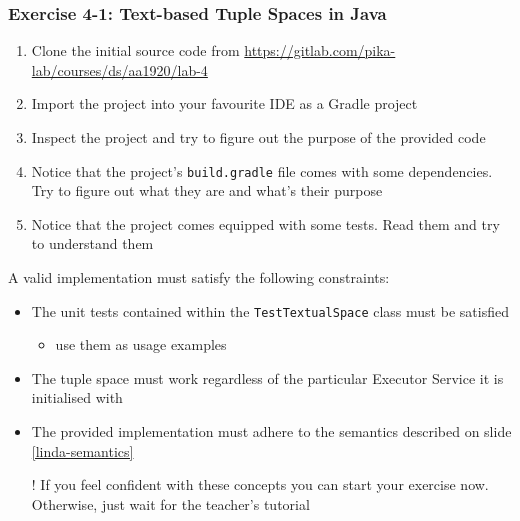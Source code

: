 \documentclass[presentation]{beamer}\mode<presentation>{\usetheme{AMSCesenaPurpleAndGold}}
\begin{document}
\begin{frame}[allowframebreaks]
\frametitle{Exercise 4-1: Text-based Tuple Spaces in Java}

\begin{enumerate}
	\item Clone the initial source code from \url{https://gitlab.com/pika-lab/courses/ds/aa1920/lab-4}
	
	\item Import the project into your favourite IDE as a Gradle project
	
	\item Inspect the project and try to figure out the purpose of the provided code
	
	\item Notice that the project's \texttt{build.gradle} file comes with some dependencies.
	Try to figure out what they are and what's their purpose
	
	\item Notice that the project comes equipped with some tests. 
	Read them and try to understand them
\end{enumerate}



\framebreak

A valid implementation must satisfy the following constraints:
%
\begin{itemize}
	
	\item The \alert{unit tests} contained within the \alert{\texttt{TestTextualSpace}} class must be satisfied
	\begin{itemize}
		\item use them as usage examples
	\end{itemize}
	
	\item The tuple space must work regardless of the particular Executor Service it is initialised with
	
	\item The provided implementation must adhere to the \alert{\linda{} semantics} described on slide \ref{linda-semantics}
	
	\vspace{.3 cm}
	
	\item[!] If you feel confident with these concepts you can start your exercise now. 
	Otherwise, just wait for the teacher's tutorial
\end{itemize}
\end{frame}
\end{document}
